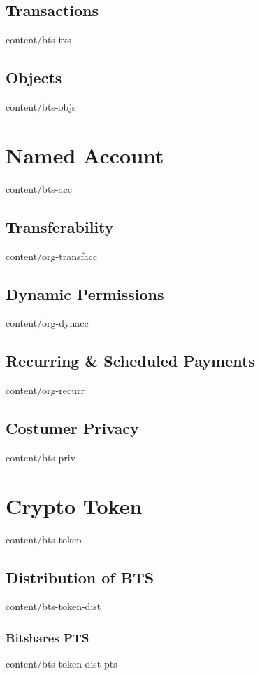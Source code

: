 \documentclass{btswhitepaper}
\begin{document}
\subsection    { Transactions                      }  { content/bts-txs             } 
\subsection    { Objects                           }  { content/bts-objs            } 

\section       { Named Account                     }  { content/bts-acc             } 
\subsection    { Transferability                   }  { content/org-transfacc       } 
\subsection    { Dynamic Permissions               }  { content/org-dynacc          } 
\subsection    { Recurring \& Scheduled Payments   }  { content/org-recurr          } 
\subsection    { Costumer Privacy                  }  { content/bts-priv            } 

\section       { Crypto Token                      }  { content/bts-token           } 
\subsection    { Distribution of BTS               }  { content/bts-token-dist      } 
\subsubsection { Bitshares PTS                     }  { content/bts-token-dist-pts  } 
\end{document}
